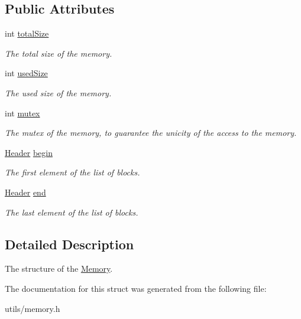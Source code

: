 \subsection*{Public Attributes}
\begin{DoxyCompactItemize}
\item 
\mbox{\label{structMemory_a168856d0599e2430a961979a4ca204d0}} 
int \hyperlink{structMemory_a168856d0599e2430a961979a4ca204d0}{total\+Size}
\begin{DoxyCompactList}\small\item\em The total size of the memory. \end{DoxyCompactList}\item 
\mbox{\label{structMemory_a719ceb2b6e7f494de7673fc5bacc02f8}} 
int \hyperlink{structMemory_a719ceb2b6e7f494de7673fc5bacc02f8}{used\+Size}
\begin{DoxyCompactList}\small\item\em The used size of the memory. \end{DoxyCompactList}\item 
\mbox{\label{structMemory_a9dd2c85715ec465afbefc0ce63c2cde8}} 
int \hyperlink{structMemory_a9dd2c85715ec465afbefc0ce63c2cde8}{mutex}
\begin{DoxyCompactList}\small\item\em The mutex of the memory, to guarantee the unicity of the access to the memory. \end{DoxyCompactList}\item 
\mbox{\label{structMemory_aecc2163eec0b2330f6e8ce789c5be7e7}} 
\hyperlink{structcell}{Header} \hyperlink{structMemory_aecc2163eec0b2330f6e8ce789c5be7e7}{begin}
\begin{DoxyCompactList}\small\item\em The first element of the list of blocks. \end{DoxyCompactList}\item 
\mbox{\label{structMemory_a9a998f6b2dacb93d29e771cab9ef9854}} 
\hyperlink{structcell}{Header} \hyperlink{structMemory_a9a998f6b2dacb93d29e771cab9ef9854}{end}
\begin{DoxyCompactList}\small\item\em The last element of the list of blocks. \end{DoxyCompactList}\end{DoxyCompactItemize}


\subsection{Detailed Description}
The structure of the \hyperlink{structMemory}{Memory}. 

The documentation for this struct was generated from the following file\+:\begin{DoxyCompactItemize}
\item 
utils/memory.\+h\end{DoxyCompactItemize}

